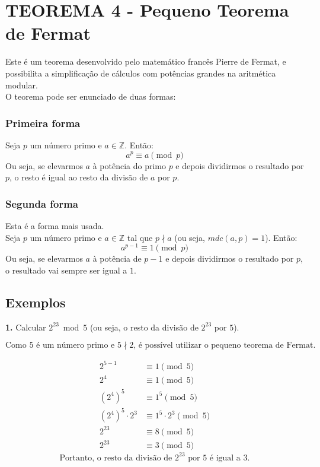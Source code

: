 \section{TEOREMA 4 - Pequeno Teorema de Fermat}
Este é um teorema desenvolvido pelo matemático francês Pierre de Fermat, e possibilita a simplificação de cálculos com potências grandes na aritmética modular.\\
O teorema pode ser enunciado de duas formas:

\subsubsection*{Primeira forma}
Seja $p$ um número primo e $a \in \mathbb{Z}$. Então:
\[
    a^p \equiv a \pmod{p}
\]
Ou seja, se elevarmos $a$ à potência do primo $p$ e depois dividirmos o resultado por $p$, o resto é igual ao resto da divisão de $a$ por $p$.

\subsubsection*{Segunda forma}
Esta é a forma mais usada.\\
Seja $p$ um número primo e $a \in \mathbb{Z}$ tal que $p \nmid a$ (ou seja, $mdc(a,p) = 1$). Então:
\[
    a^{p-1} \equiv 1 \pmod {p}
\]
Ou seja, se elevarmos $a$ à potência de $p-1$ e depois dividirmos o resultado por $p$, o resultado vai sempre ser igual a $1$.

\subsection*{Exemplos}
\textbf{1.} Calcular $2^{23} \bmod 5$ (ou seja, o resto da divisão de $2^{23}$ por $5$).

\[
    \text{Como 5 é um número primo e $5 \nmid 2$, é possível utilizar o pequeno teorema de Fermat.}
\]

\setcounter{equation}{0}
\begin{align}
    2^{5-1}                 & \equiv 1 \pmod{5}                 \\
    2^{4}                   & \equiv 1 \pmod {5}                \\
    (2^{4})^{5}             & \equiv 1^{5} \pmod {5}            \\
    (2^{4})^{5} \cdot 2^{3} & \equiv 1^{5} \cdot 2^{3} \pmod{5} \\
    2^{23}                  & \equiv 8 \pmod{5}                 \\
    2^{23}                  & \equiv 3 \pmod {5}
\end{align}
\[
    \text{Portanto, o resto da divisão de $2^{23}$ por 5 é igual a 3.}
\]
